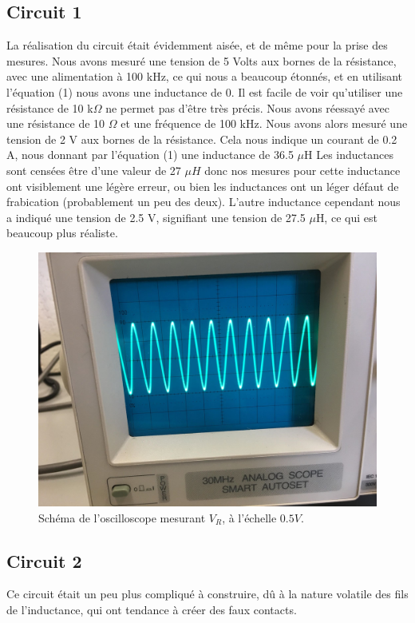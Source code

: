 \documentclass{article}
\begin{document}
\subsection{Circuit 1}
La réalisation du circuit était évidemment aisée, et de même pour la prise des mesures. Nous avons mesuré une 
tension  de 5 Volts aux bornes de la résistance, avec une alimentation à 100 kHz, ce qui nous a beaucoup étonnés, et en utilisant l'équation (1)
nous avons une inductance de 0.
Il est facile de voir qu'utiliser une résistance de 10 k$\Omega$ ne permet pas d'être très précis. Nous avons réessayé avec
une résistance de 10 $\Omega$ et une fréquence de 100 kHz. Nous avons alors mesuré une tension de 2 V aux bornes
de la résistance. Cela nous indique un courant de 0.2 A, nous donnant par l'équation (1) une inductance de 36.5 $\mu$H
Les inductances sont censées être d'une valeur de 27 $\mu H$ donc nos mesures pour cette inductance ont visiblement une légère erreur, ou bien les inductances
ont un léger défaut de frabication (probablement un peu des deux). L'autre inductance cependant nous a indiqué une tension de 2.5 V,
signifiant une tension de 27.5 $\mu$H, ce qui est beaucoup plus réaliste.
\newpage
\begin{figure}[h]
    \centering
        \includegraphics[scale = 0.12]{oscillo_1.jpg}
        \caption{Schéma de l'oscilloscope mesurant $V_{R}$, à l'échelle $0.5V$.}
        \label{fig:my_label}
\end{figure}
\subsection{Circuit 2}
Ce circuit était un peu plus compliqué à construire, dû à la nature volatile des fils de l'inductance, qui ont tendance à
créer des faux contacts.
\end{document}
